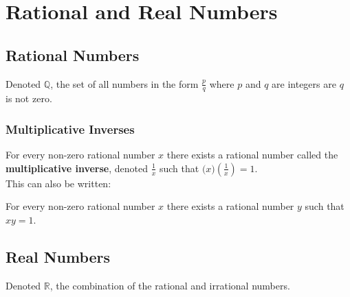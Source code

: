 \documentclass[../notes.tex]{subfiles}
\begin{document}
	\ifSubfilesClassLoaded{\setcounter{chapter}{1}}{}
	\chapter{Rational and Real Numbers}
		\section{Rational Numbers}
			Denoted $\mathbb{Q}$, the set of all numbers in the form $\frac{p}{q}$ where $p$ and $q$ are integers are $q$ is not zero.
			\subsection{Multiplicative Inverses}
				For every non-zero rational number $x$ there exists a rational number called the \textbf{multiplicative inverse}, denoted $\frac{1}{x}$ such that $\bigl(x\bigr)\left(\frac{1}{x}\right) = 1$.\\
				\nopagebreak
				This can also be written:
				\nopagebreak
				\begin{indentparagraph}
					For every non-zero rational number $x$ there exists a rational number $y$ such that $xy = 1$.
				\end{indentparagraph}
		\section{Real Numbers}
			Denoted $\mathbb{R}$, the combination of the rational and irrational numbers.
\end{document}
